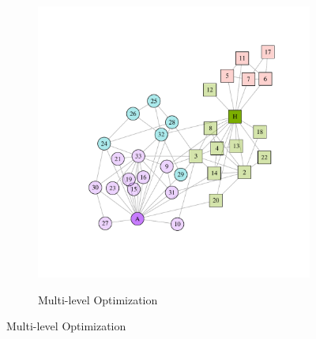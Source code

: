 \begin{figure}
\begin{subfigure}[b]{0.32\textwidth}
\label{fig:leading_eigen}
\end{subfigure}
\hfill
\begin{subfigure}[b]{0.32\textwidth}
\caption{Multi-level Optimization}
\includegraphics[width=\textwidth,trim={0.75in 0.75in 0.75in 0.75in}, clip=True]{louvain.pdf}
\label{fig:louvain}
\end{subfigure}


\end{figure}
